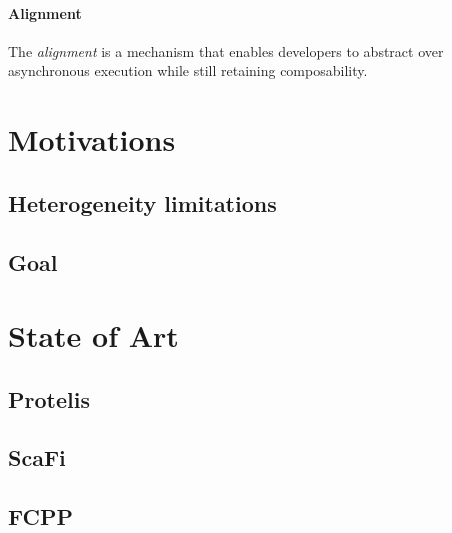 \paragraph{Alignment}
The \emph{alignment} is a mechanism that enables developers to abstract over asynchronous execution while still retaining
composability.

\section{Motivations}
\label{sec:motivations}


\subsection{Heterogeneity limitations}
\label{subsec:heterogeneity-limitations}

\subsection{Goal}
\label{subsec:goal}


\section{State of Art}
\label{sec:state-of-art}

\subsection{Protelis}
\label{subsec:protelis}

\subsection{ScaFi}
\label{subsec:scafi}

\subsection{FCPP}
\label{subsec:fcpp}


%
%
%
%
%
